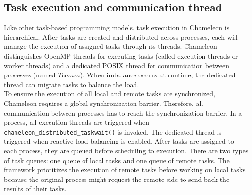 

\subsection{Task execution and communication thread}
\label{subsec:task-exe-Tcomm}

Like other task-based programming models, task execution in Chameleon is hierarchical. After tasks are created and distributed across processes, each will manage the execution of assigned tasks through its threads. Chameleon distinguishes OpenMP threads for executing tasks (called execution threads or worker threads) and a dedicated POSIX thread for communication between processes (named $Tcomm$). When imbalance occurs at runtime, the dedicated thread can migrate tasks to balance the load.\\

To ensure the execution of all local and remote tasks are synchronized, Chameleon requires a global synchronization barrier. Therefore, all communication between processes has to reach the synchronization barrier. In a process, all execution threads are triggered when \texttt{chameleon\_distributed\_taskwait()} is invoked. The dedicated thread is triggered when reactive load balancing is enabled. After tasks are assigned to each process, they are queued before scheduling to execution. There are two types of task queues: one queue of local tasks and one queue of remote tasks. The framework prioritizes the execution of remote tasks before working on local tasks because the original process might request the remote side to send back the results of their tasks.


